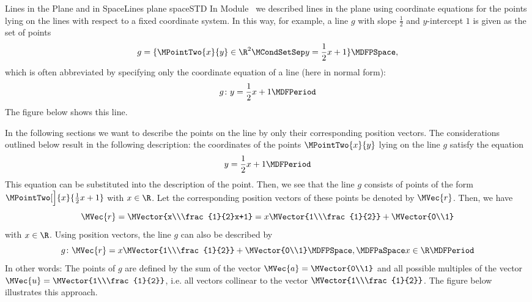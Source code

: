 \begin{MXContent}{Lines in the Plane and in Space}{Lines plane space}{STD}
In Module~ we described lines in the plane using coordinate equations for the 
points lying on the lines with respect to a fixed coordinate system. In this way, for example, a 
line $g$ with slope $\frac{1}{2}$ and $y$-intercept $1$ is given as the set of points
\[
 g=\{\MPointTwo{x}{y}\in\R^2\MCondSetSep y=\frac{1}{2}x+1\} \MDFPSpace,
\]
which is often abbreviated by specifying only the coordinate equation of a line (here in normal form):
\[
 g\colon y=\frac{1}{2}x+1\MDFPeriod
\]
The figure below shows this line.
\begin{center}
\end{center}

In the following sections we want to describe the points on the line by only their corresponding position vectors. 
The considerations outlined below result in the following description: the coordinates of the points $\MPointTwo{x}{y}$
lying on the line $g$ satisfy the equation
\[
 y=\frac{1}{2}x+1\MDFPeriod
\]
This equation can be substituted into the description of the point. Then, we see that the line $g$ consists
of points of the form $\MPointTwo[\Big]{x}{\frac{1}{2}x+1}$ with $x\in\R$. Let the corresponding position
vectors of these points be denoted by $\MVec{r}$. Then, we have
\[
 \MVec{r}=\MVector{x\\\frac{1}{2}x+1}=x\MVector{1\\\frac{1}{2}}+\MVector{0\\1}
\]
with $x\in\R$. Using position vectors, the line $g$ can also be described by
\[
 g\colon \MVec{r}=x\MVector{1\\\frac{1}{2}}+\MVector{0\\1} \MDFPSpace,\MDFPaSpace x\in\R \MDFPeriod
\]
In other words: The points of $g$ are defined by the sum of the vector $\MVec{a}=\MVector{0\\1}$ and all 
possible multiples of the vector $\MVec{u}=\MVector{1\\\frac{1}{2}}$, i.e. all vectors collinear to 
the vector $\MVector{1\\\frac{1}{2}}$. The figure below illustrates this approach.


\end{MXContent}
